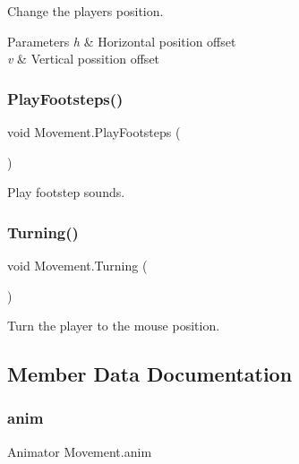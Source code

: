 Change the player\textquotesingle{}s position. 


\begin{DoxyParams}{Parameters}
{\em h} & Horizontal position offset \\
\hline
{\em v} & Vertical possition offset \\
\hline
\end{DoxyParams}
\mbox{\label{class_movement_a2859a517a3eef83923d130787a54599b}} 
\subsubsection{\texorpdfstring{PlayFootsteps()}{PlayFootsteps()}}
{\footnotesize\ttfamily void Movement.\+Play\+Footsteps (\begin{DoxyParamCaption}{ }\end{DoxyParamCaption})\hspace{0.3cm}{\ttfamily [private]}}



Play footstep sounds. 

\mbox{\label{class_movement_a428972ace717e70397a5825341567a9b}} 
\subsubsection{\texorpdfstring{Turning()}{Turning()}}
{\footnotesize\ttfamily void Movement.\+Turning (\begin{DoxyParamCaption}{ }\end{DoxyParamCaption})\hspace{0.3cm}{\ttfamily [private]}}



Turn the player to the mouse position. 



\subsection{Member Data Documentation}
\mbox{\label{class_movement_ad8e9965347ca0aedcea1f433bb6d0445}} 
\subsubsection{\texorpdfstring{anim}{anim}}
{\footnotesize\ttfamily Animator Movement.\+anim\hspace{0.3cm}{\ttfamily [private]}}

